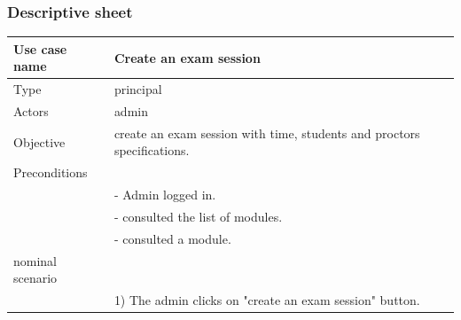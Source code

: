 \documentclass[]{uc2pfecaneva}
\begin{document}
\subsubsection{Descriptive sheet}
\begin{table}[h]
	\centering
	\begin{tabularx}{\textwidth}{|l|X|}
		\hline
		Use case name         & Create an exam session                                                                                                                                            \\ \hline
		Type                  & principal                                                                                                                                                         \\ \hline
		Actors                & admin                                                                                                                                                             \\ \hline
		Objective             & create an exam session with time, students and proctors specifications.                                                                                           \\ \hline
		Preconditions         &                                                                                                                                                                   \\
		& - Admin logged in.                                                                                                                                                \\
		& - consulted the list of modules.                                                                                                                                  \\
		& - consulted a module.                                                                                                                                             \\ \hline
		nominal scenario      &                                                                                                                                                                   \\
		& 1) The admin clicks on "create an exam session" button.                                                                                                           \\

\end{tabularx}
\end{table}
\end{document}
